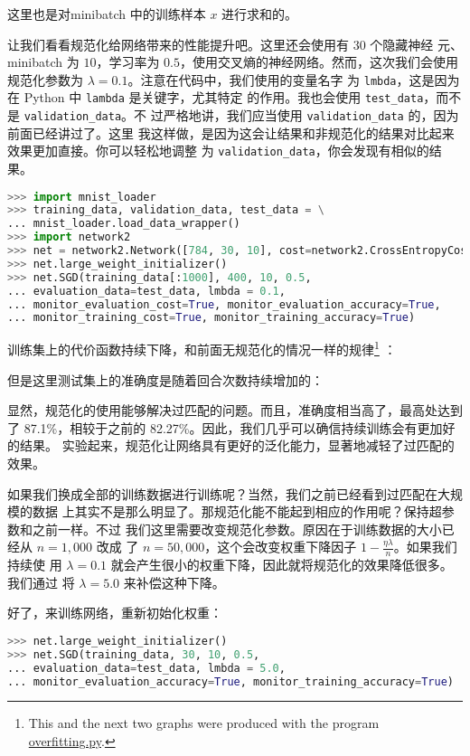 这里也是对minibatch 中的训练样本 $x$ 进行求和的。

让我们看看规范化给网络带来的性能提升吧。这里还会使用有 $30$ 个隐藏神经
元、minibatch 为 $10$，学习率为 $0.5$，使用交叉熵的神经网络。然而，这次我们会使用
规范化参数为 $\lambda = 0.1$。注意在代码中，我们使用的变量名字
为 \lstinline!lmbda!，这是因为在 Python 中 \lstinline!lambda! 是关键字，尤其特定
的作用。我也会使用 \lstinline!test_data!，而不是 \lstinline!validation_data!。不
过严格地讲，我们应当使用 \lstinline!validation_data! 的，因为前面已经讲过了。这里
我这样做，是因为这会让结果和非规范化的结果对比起来效果更加直接。你可以轻松地调整
为 \lstinline!validation_data!，你会发现有相似的结果。

\begin{lstlisting}[language=Python]
>>> import mnist_loader
>>> training_data, validation_data, test_data = \
... mnist_loader.load_data_wrapper()
>>> import network2
>>> net = network2.Network([784, 30, 10], cost=network2.CrossEntropyCost)
>>> net.large_weight_initializer()
>>> net.SGD(training_data[:1000], 400, 10, 0.5,
... evaluation_data=test_data, lmbda = 0.1,
... monitor_evaluation_cost=True, monitor_evaluation_accuracy=True,
... monitor_training_cost=True, monitor_training_accuracy=True)
\end{lstlisting}

训练集上的代价函数持续下降，和前面无规范化的情况一样的规律\footnote{This and the
  next two graphs were produced with the program
  \href{https://github.com/mnielsen/neural-networks-and-deep-learning/blob/master/fig/overfitting.py}{overfitting.py}.}
：

但是这里测试集上的准确度是随着回合次数持续增加的：

显然，规范化的使用能够解决过匹配的问题。而且，准确度相当高了，最高处达到
了 87.1\%，相较于之前的 82.27\%。因此，我们几乎可以确信持续训练会有更加好的结果。
实验起来，规范化让网络具有更好的泛化能力，显著地减轻了过匹配的效果。

如果我们换成全部的训练数据进行训练呢？当然，我们之前已经看到过匹配在大规模的数据
上其实不是那么明显了。那规范化能不能起到相应的作用呢？保持超参数和之前一样。不过
我们这里需要改变规范化参数。原因在于训练数据的大小已经从 $n=1,000$ 改成
了 $n=50,000$，这个会改变权重下降因子 $1-\frac{\eta\lambda}{n}$。如果我们持续使
用 $\lambda = 0.1$ 就会产生很小的权重下降，因此就将规范化的效果降低很多。我们通过
将 $\lambda = 5.0$ 来补偿这种下降。

好了，来训练网络，重新初始化权重：

\begin{lstlisting}[language=Python]
>>> net.large_weight_initializer()
>>> net.SGD(training_data, 30, 10, 0.5,
... evaluation_data=test_data, lmbda = 5.0,
... monitor_evaluation_accuracy=True, monitor_training_accuracy=True)
\end{lstlisting}

